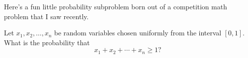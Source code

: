 Here's a fun little probability subproblem born out of a competition math
problem that I saw recently.

\begin{blackbox}
    \begin{problem}
        Let \( x_1, x_2, \ldots, x_n \) be random variables chosen uniformly
        from the interval \( \left[0, 1\right] \). What is the probability that
        \[
            x_1 + x_2 + \cdots + x_n \geq 1
        ?\]
    \end{problem}
\end{blackbox}
